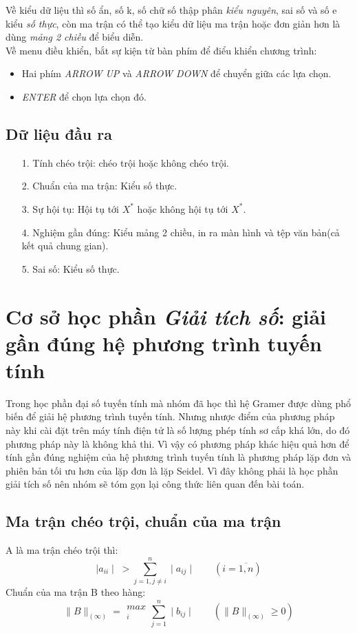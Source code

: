 \documentclass[twoside]{report2}
\begin{document}
Về kiểu dữ liệu thì số ẩn, số k, số chữ số thập phân \emph{kiểu nguyên}, sai số và số e kiểu \emph{số thực}, còn ma trận có thể tạo kiểu dữ liệu ma trận hoặc đơn giản hơn là dùng \emph{mảng 2 chiều} để biểu diễn.\\

Về menu điều khiển, bắt sự kiện từ bàn phím để điểu khiển chương trình:
\begin{itemize}
	\item Hai phím \emph{ARROW UP} và \emph{ARROW DOWN} để chuyển giữa các lựa chọn.
	\item \emph{ENTER} để chọn lựa chọn đó.
\end{itemize}
\subsection{Dữ liệu đầu ra}
\begin{itemize}
	\item[1.] Tính chéo trội: chéo trội hoặc không chéo trội.
	\item[2.] Chuẩn của ma trận: Kiểu số thực.
	\item[3.] Sự hội tụ: Hội tụ tới $X^*$ hoặc không hội tụ tới $X^*$.
	\item[4.] Nghiệm gần đúng: Kiểu mảng 2 chiều, in ra màn hình và tệp văn bản(cả kết quả chung gian).
	\item[5.] Sai số: Kiểu số thực.
	
\end{itemize}


\section[Cơ sở toán học]{Cơ sở học phần \emph{Giải tích số}: giải gần đúng hệ phương trình tuyến tính}
Trong học phần đại số tuyến tính mà nhóm đã học thì hệ Gramer được dùng phổ biến để giải hệ phương trình tuyến tính. Nhưng nhược điểm của phương pháp này khi cài đặt trên máy tính điện tử là số lượng phép tính sơ cấp khá lớn, do đó phương pháp này là không khả thi. Vì vậy có phương pháp khác hiệu quả hơn để tính gần đúng nghiệm của hệ phương trình tuyến tính là phương pháp lặp đơn và phiên bản tối ưu hơn của lặp đơn là lặp Seidel.
Vì đây không phải là học phần giải tích số nên nhóm sẽ tóm gọn lại công thức liên quan đến bài toán.

\subsection{Ma trận chéo trội, chuẩn của ma trận}
A là ma trận chéo trội thì:
\begin{equation} \label{eq:1}
\mid a_{ii} \mid \; > \sum_{j = 1, j \neq i}^n \mid a_{ij} \mid \qquad  (i= \overline{1,n})
\end{equation}
Chuẩn của ma trận B theo hàng:
\begin{equation} \label{eq:2}
\big\|B\big\|_{(\infty)} =
\begin{array}{c}
\\
max\\
^i
\end{array}
\sum_{j=1}^n \mid b_{ij}\mid \qquad (\big\|B\big\|_{(\infty)} \ge 0)
\end{equation}
\end{document}
